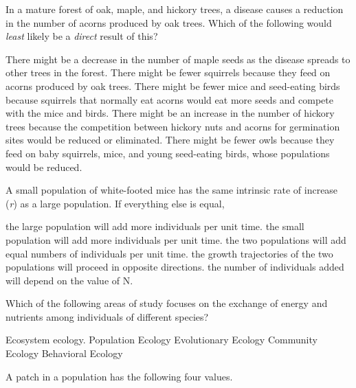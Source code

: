 \question
In a mature forest of oak, maple, and hickory trees, a disease causes a reduction in the number of acorns produced by oak trees. Which of the following would \emph{least} likely be a \emph{direct} result of this? 

\begin{choices}
\correctchoice There might be a decrease in the number of maple seeds as the disease spreads to other trees in the forest. %
\choice There might be fewer squirrels because they feed on acorns produced by oak trees. %
\choice  There might be fewer mice and seed-eating birds because squirrels that normally eat acorns would eat more seeds and compete with the mice and birds.%
\choice There might be an increase in the number of hickory trees because the competition between hickory nuts and acorns for germination sites would be reduced or eliminated. %
\choice There might be fewer owls because they feed on baby squirrels, mice, and young seed-eating birds, whose populations would be reduced. %
\end{choices}

\question
A small population of white-footed mice has the same intrinsic rate of increase (\textit{r}) as a large population.  If everything else is equal, 

\begin{choices}
\correctchoice the large population will add more individuals per unit time.  %
\choice the small population will add more individuals per unit time. %
\choice the two populations will add equal numbers of individuals per unit time.%
\choice the growth trajectories of the two populations will proceed in opposite directions. %
\choice the number of individuals added will depend on the value of N. %
\end{choices}

\question
Which of the following areas of study focuses on the exchange of energy and nutrients among individuals of different species?

\begin{choices}
\correctchoice Ecosystem ecology. %
\choice Population Ecology %
\choice Evolutionary Ecology %
\choice Community Ecology %
\choice Behavioral Ecology %
\end{choices}


\question
A patch in a population has the following four values. 

